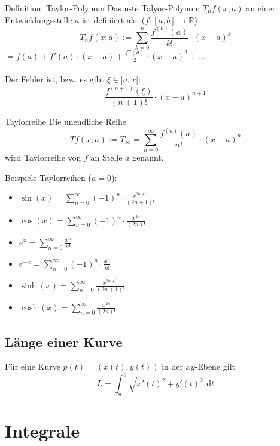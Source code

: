\documentclass[a4paper,10pt]{article}
\def\sumn{\sum_{n=0}^\infty}
\begin{document}
\begin{subbox}{Definition: Taylor-Polynom}
	Das n-te Talyor-Polynom $T_n f(x; a)$ an einer Entwicklungsstelle $a$ ist definiert als: ($f: [a,b] \to \mathbb{R}$)
	$$T_n f(x; a) := \sum_{k=0}^{n} \frac{f^{(k)} (a)}{k!} \cdot (x - a)^k$$ 
	$ = f(a) + f'(a) \cdot (x-a) + \frac{f''(a)}{2} \cdot (x - a)^2 + \ldots$\\
	\\Der Fehler ist, bzw. es gibt $\xi \in ]a,x[$:
	$$\frac{f^{(n+1)} (\xi)}{(n+1)!} \cdot (x - a)^{n+1}$$
\end{subbox}

\begin{mainbox}{Taylorreihe}
	Die unendliche Reihe
	$$Tf(x;a) := T_\infty = \sumn \frac{f^{(n)}(a)}{n!} \cdot (x-a)^n$$
	wird Taylorreihe von $f$ an Stelle $a$ genannt.
\end{mainbox}
Beispiele Taylorreihen ($a = 0$):
\begin{itemize}
	\item $\sin(x) = \sumn (-1)^n \cdot \frac{x^{2n+1}}{(2n+1)!}$
	\item $\cos(x) = \sumn (-1)^n \cdot \frac{x^{2n}}{(2n)!}$
	\item $e^x = \sumn \frac{x^n}{n!}$
	\item $e^{-x} = \sumn (-1)^n \cdot \frac{x^n}{n!}$
	\item $\sinh(x) = \sumn \frac{x^{2n+1}}{(2n+1)!}$
	\item $\cosh(x) = \sumn \frac{x^{2n}}{(2n)!}$
\end{itemize}

\subsection{Länge einer Kurve}
Für eine Kurve $p(t) = (x(t), y(t))$ in der $xy$-Ebene gilt 
$$L = \int_a^b \sqrt{x'(t)^2+ y'(t)^2} \text{ d}t$$

\section{Integrale}
\end{document}
